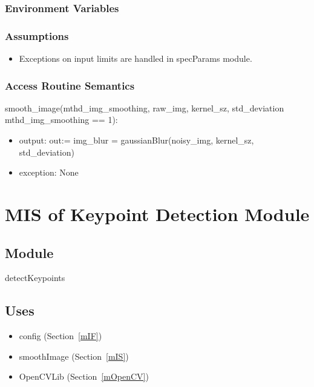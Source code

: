 \documentclass[12pt, titlepage]{article}
\begin{document}
\subsubsection{Environment Variables}

\subsubsection{Assumptions}
  \begin{itemize}
  \item Exceptions on input limits are handled in specParams module.
  \end{itemize}

\subsubsection{Access Routine Semantics}

\noindent smooth\_image(mthd\_img\_smoothing, raw\_img, 
kernel\_sz, std\_deviation \textbar \: mthd\_img\_smoothing == 1):
\begin{itemize}
\item output: out:= img\_blur = gaussianBlur(noisy\_img, 
  kernel\_sz, std\_deviation)
\end{itemize}

\begin{itemize}
\item exception: None
\end{itemize}




\section{MIS of Keypoint Detection Module} \label{mKD}


\subsection{Module}

detectKeypoints

\subsection{Uses}
\begin{itemize}
  \item config (Section~\ref{mIF})
  \item smoothImage (Section~\ref{mIS}) %
  \item OpenCVLib (Section~\ref{mOpenCV})
\end{itemize}
\end{document}
